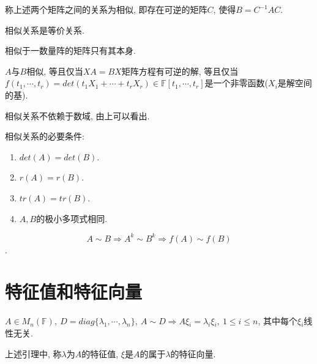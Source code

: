 \begin{definition}[相似]
    称上述两个矩阵之间的关系为相似, 即存在可逆的矩阵$C$, 使得$B=C^{-1}AC$.
\end{definition}

\begin{statement}
    相似关系是等价关系.
\end{statement}

\begin{example}
    相似于一数量阵的矩阵只有其本身.
\end{example}

\begin{example}
    $A$与$B$相似, 等且仅当$XA=BX$矩阵方程有可逆的解, 等且仅当$f(t_1, \cdots, t_r)=det(t_1X_1+\cdots+t_rX_r)\in \mathbb{F}[t_1, \cdots, t_r]$是一个非零函数($X_i$是解空间的基).
\end{example}

\begin{statement}
    相似关系不依赖于数域, 由上可以看出.
\end{statement}

\begin{property}
    相似关系的必要条件:
    \begin{enumerate}[itemindent=1em]
        \item $det(A)=det(B)$.
        \item $r(A)=r(B)$.
        \item $tr(A)=tr(B)$.
        \item $A, B$的极小多项式相同.
    \end{enumerate}
\end{property}

\begin{lemma}
    \[A\sim B\Longrightarrow A^k\sim B^k\Longrightarrow f(A)\sim f(B)\].
\end{lemma}

\section{ 特征值和特征向量 }

\begin{lemma}
    $A\in M_n(\mathbb{F}), \ D=diag\{\lambda{_1}, \cdots, \lambda{_n}\},\ A\sim D\Longrightarrow A\xi{_i}=\lambda{_i}\xi{_i}, \ 1\le i \le n$, 其中每个$\xi{_i}$线性无关.
\end{lemma}

\begin{definition}[特征向量]
    上述引理中, 称$\lambda$为$A$的特征值, $\xi$是$A$的属于$\lambda$的特征向量.
\end{definition}

